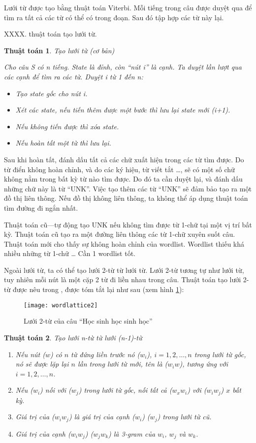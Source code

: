 \documentclass[a4paper,oneside]{book} %
\newtheorem{algo}{Thuật toán}
\begin{document}
Lưới từ được tạo bằng thuật toán Viterbi. Mỗi tiếng trong câu được
duyệt qua để tìm ra tất cả các từ có thể có trong đoạn. Sau đó tập hợp
các từ này lại. 

XXXX. thuật toán tạo lưới từ.
\begin{algo} Tạo lưới từ (cơ bản)

Cho câu S có n tiếng. State là đỉnh, còn ``nút i'' là cạnh. Ta duyệt
lần lượt qua các cạnh để tìm  ra các từ. Duyệt i từ 1 đến n:
\begin{itemize}
\item Tạo state gốc cho nút i.
\item Xét các state, nếu tiến thêm được một bước thì lưu lại state mới (i+1).
\item Nếu không tiến được thì xóa state.
\item Nếu hoàn tất một từ thì lưu lại.
\end{itemize}
\end{algo}

Sau khi hoàn tất, đánh dấu tất cả các chữ xuất hiện trong các từ tìm
được. Do từ điển không hoàn chỉnh, và do các ký hiệu, từ viết tắt
\ldots{}, sẽ có một số chữ không nằm trong bất kỳ từ nào tìm được. Do
đó ta cần duyệt lại, và đánh dấu những chữ này là từ ``UNK''. Việc tạo
thêm các từ ``UNK'' sẽ đảm bảo tạo ra một đồ thị liên thông. Nếu đồ
thị không liên thông, ta không thể áp dụng thuật toán tìm đường đi
ngắn nhất.

Thuật toán cũ---tự động tạo UNK nếu không tìm được từ 1-chữ tại
một vị trí bất kỳ. Thuật toán cũ tạo ra một đường liên thông các từ
1-chữ xuyên suốt câu. Thuật toán mới cho thấy sự không hoàn chỉnh của
wordlist. Wordlist thiếu khá nhiều những từ 1-chữ \ldots{} Cần 1
wordlist tốt.

Ngoài lưới từ, ta có thể tạo lưới 2-từ từ lưới từ. Lưới 2-từ tương tự
như lưới từ, tuy nhiên mỗi nút là một cặp 2 từ đi liền nhau trong câu. Thuật toán
tạo lưới 2-từ được nêu trong \cite{Ravishankar}, được tóm tắt lại như
sau (xem hình \ref{fig:wordlattice2}):

\begin{figure}[htbp]
  \centering
  \texttt{[image: wordlattice2]}
  \caption{Lưới 2-từ của câu ``Học sinh học sinh học''}
  \label{fig:wordlattice2}
\end{figure}

\begin{algo}Tạo lưới n-từ từ lưới (n-1)-từ

\begin{enumerate}
\item Nếu nút ($w$) có $n$ từ đứng liền trước nó ($w_i$),
  $i=1,2,\ldots,n$ trong lưới từ gốc, nó sẽ được lặp lại $n$ lần trong
  lưới từ mới, tên là ($w_{i}w$), tương ứng với $i=1,2,\ldots,n$.
\item Nếu ($w_i$) nối với ($w_j$) trong lưới từ gốc, nối tất cả
  ($w_xw_i$) với ($w_iw_j$) $x$ bất kỳ.
\item Giá trị của ($w_iw_j$) là giá trị của cạnh ($w_i$) ($w_j$) trong
  lưới từ cũ.
\item Giá trị của cạnh ($w_iw_j$) ($w_jw_k$) là 3-gram của $w_i$, $w_j$
  và $w_k$.
\end{enumerate}
\end{algo}
\end{document}
